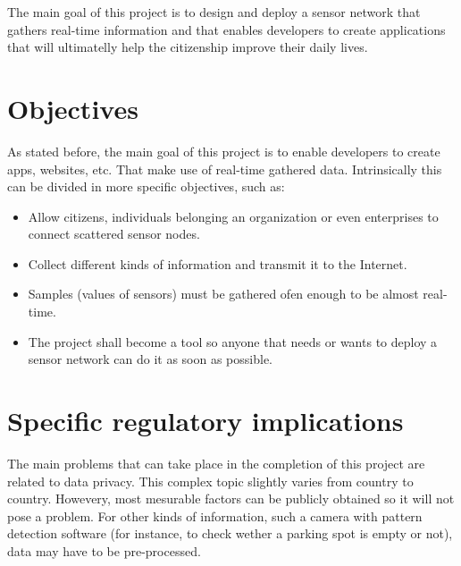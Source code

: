 The main goal of this project is to design and deploy a sensor network that gathers real-time information and that enables developers to create applications that will ultimatelly help the citizenship improve their daily lives.

\section{Objectives}

As stated before, the main goal of this project is to enable developers to create apps, websites, etc. That make use of real-time gathered data. Intrinsically this can be divided in more specific objectives, such as:

\begin{itemize}
    \item Allow citizens, individuals belonging an organization or even enterprises to connect scattered sensor nodes.
    \item Collect different kinds of information and transmit it to the Internet.
    \item Samples (values of sensors) must be gathered ofen enough to be almost real-time.
    \item The project shall become a tool so anyone that needs or wants to deploy a sensor network can do it as soon as possible.
\end{itemize}

\section{Specific regulatory implications}

The main problems that can take place in the completion of this project are related to data privacy. This complex topic slightly varies from country to country. Howevery, most mesurable factors can be publicly obtained so it will not pose a problem. For other kinds of information, such a camera with pattern detection software (for instance, to check wether a parking spot is empty or not), data may have to be pre-processed.


